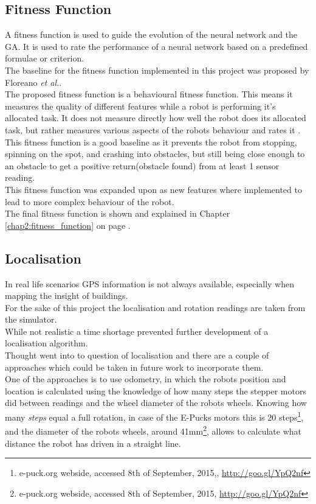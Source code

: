 \subsection{Fitness Function}
A fitness function is used to guide the evolution of the neural network and the GA. It is used to rate the performance of a neural network based on a predefined formulae or criterion.\\
The baseline for the fitness function implemented in this project was proposed by Floreano \textit{et al.}\cite{499791}. \\
The proposed fitness function is a behavioural fitness function. This means it measures the quality of different features while a robot is performing it's allocated task. It does not measure directly how well the robot does its allocated task, but rather measures various aspects of the robots behaviour and rates it \cite{Nelson2009Fitness}.
This fitness function is a good baseline as it prevents the robot from stopping, spinning on the spot, and crashing into obstacles, but still being close enough to an obstacle to get a positive return(obstacle found) from at least 1 sensor reading. \\
This fitness function was expanded upon as new features where implemented to lead to more complex behaviour of the robot.\\
The final fitness function is shown and explained in Chapter \ref{chap2:fitness_function} on page \pageref{chap2:fitness_function}.

\subsection{Localisation}
In real life scenarios GPS information is not always available, especially when mapping the insight of buildings. \\
For the sake of this project the localisation and rotation readings are taken from the simulator. \\

While not realistic a time shortage prevented further development of a localisation algorithm.\\
Thought went into to question of localisation and there are a couple of approaches which could be taken in future work to incorporate them. \\
One of the approaches is to use odometry, in which the robots position and location is calculated using the knowledge of how many steps the stepper motors did between readings and the wheel diameter of the robots wheels. Knowing how many \textit{steps} equal a full rotation, in case of the E-Pucks motors this is 20 steps\footnote{e-puck.org webside, accessed 8th of September, 2015,, \url{http://goo.gl/YpQ2nf}}, and the diameter of the robots wheels, around 41mm\footnote{e-puck.org webside, accessed 8th of September, 2015, \url{http://goo.gl/YpQ2nf}}, allows to calculate what distance the robot has driven in a straight line. \\

